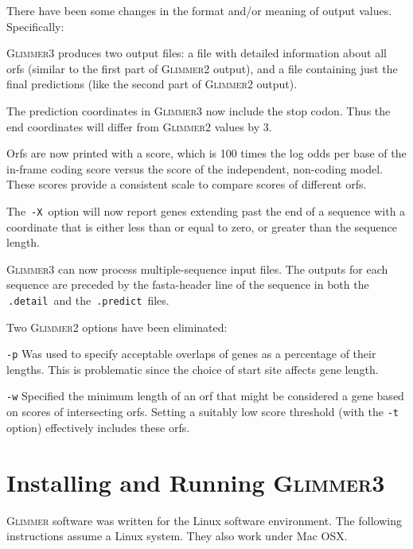 \documentclass[fleqn,titlepage,11pt]{article}
\def\Glimmer{\textsc{Glimmer}}
\def\Gtwo{\textsc{Glimmer2}}
\def\Gthree{\textsc{Glimmer3}}
\def\Pg#1{\texttt{#1}}
\begin{document}
\item
  There have been some changes in the format and/or meaning of
  output values.  Specifically:
  \bn\RaggedRight
  \item
    \Gthree{} produces two output files:  a file with detailed
    information about all orfs (similar to the first part of
    \Gtwo{} output), and a file containing just the final
    predictions (like the second part of \Gtwo{} output).
  \item
    The prediction coordinates in \Gthree{} now include the
    stop codon.  Thus the end coordinates will differ from
    \Gtwo{} values by 3.
  \item
    Orfs are now printed with a score, which is 100 times the
    log odds per base of the in-frame coding score versus the score
    of the independent, non-coding model.  These scores provide
    a consistent scale to compare scores of different orfs.
  \item
    The \,\verb`-X`\, option will now report genes extending
    past the end of a sequence with a coordinate that is
    either less than or equal to zero, or greater than the
    sequence length.
  \en

\item
  \Gthree{} can now process multiple-sequence input files.
  The outputs for each sequence are preceded by the
  fasta-header line of the sequence in both the \,\verb`.detail`\,
  and the \,\verb`.predict`\, files.

\item
  Two \Gtwo{} options have been eliminated:
\bl{\settowidth{\labelwidth}{\Pg{-p}}\leftmargin=\labelwidth \addtolength{\leftmargin}{1em}\labelsep=1em}\RaggedRight
  \item[\Pg{-p}]
    Was used to specify acceptable overlaps of genes as a percentage
    of their lengths.  This is problematic since the choice of start site
    affects gene length.
  \item[\Pg{-w}]
    Specified the minimum length of an orf that might be considered a gene
    based on scores of intersecting orfs.  Setting a suitably low score
    threshold (with the \Pg{-t} option) effectively includes these orfs.
  \el

\en


\section{Installing and Running \Gthree}

\Glimmer{} software was written for the Linux software
environment.  The following instructions assume a Linux
system.  They also work under Mac OSX.
\end{document}
